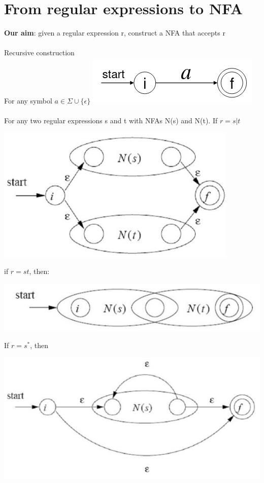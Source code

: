 \documentclass{article}[18pt]
\begin{document}
\section{From regular expressions to NFA}
\textbf{Our aim}: given a regular expression r, construct a NFA that accepts r\\
\\
Recursive construction\\
For any symbol $a\in \Sigma \cup \{\epsilon\}$ 
\includegraphics[scale=0.6]{recusrive}\\
\\
For any two regular expressions s and t with NFAs N(s) and N(t).
\newpage
If $r=s|t$
\begin{center}
	\includegraphics[scale=0.7]{"Two Regular Expressions"}
\end{center}
if $r=st$, then:
\begin{center}
	\includegraphics[scale=0.7]{r=st}
\end{center}
If $r=s^*$, then
\begin{center}
	\includegraphics[scale=0.7]{rs}
\end{center}
\end{document}
